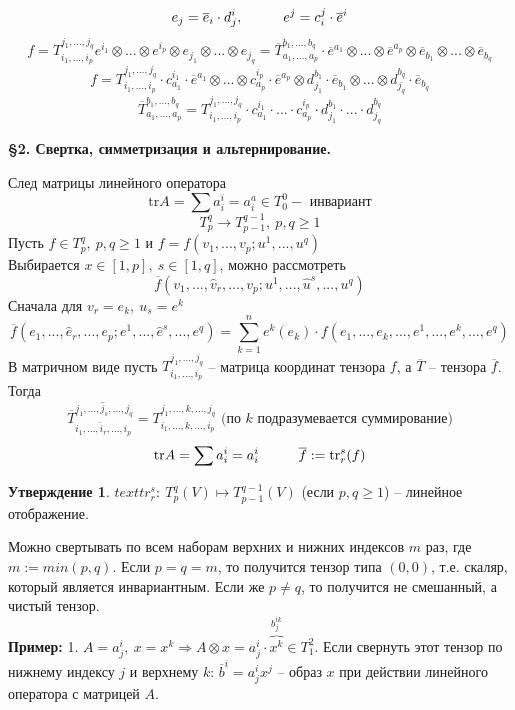 \documentclass[a4paper, 12pt]{article}
\newcommand\tab[1][.5cm]{\hspace*{#1}}
\theoremstyle{definition}
\newtheorem*{subtheorem}{Утверждение}
\begin{document}
    $$e_j = \overline{e}_i\cdot d_j^i,\tab[1cm] e^j = c_i^j\cdot \overline{e}^i$$ 
    $$f = T_{i_1,...,i_p}^{j_1,...,j_q}e^{i_1}\otimes ... \otimes e^{i_p} \otimes e_{j_1} \otimes ... \otimes e_{j_q} = \overline{T}_{a_1,...,a_p}^{b_1,...,b_q} \cdot\overline{e}^{a_1}\otimes ... \otimes \overline{e}^{a_p}\otimes \overline{e}_{b_1}\otimes ... \otimes \overline{e}_{b_q}$$
    $$f = T_{i_1,...,i_p}^{j_1,...,j_q}\cdot c_{a_1}^{i_1}\cdot \overline{e}^{a_1} \otimes ... \otimes c_{a_p}^{i_p}\cdot \overline{e}^{a_p} \otimes d_{j_1}^{b_1}\cdot \overline{e}_{b_1} \otimes ... \otimes d_{j_q}^{b_q}\cdot \overline{e}_{b_q}$$
    $$\boxed{\overline{T}_{a_1,...,a_p}^{b_1,...,b_q} = T_{i_1,...,i_p}^{j_1,...,j_q}\cdot c_{a_1}^{i_1}\cdot ... \cdot c_{a_p}^{i_p} \cdot d_{j_1}^{b_1}\cdot ... \cdot d_{j_q}^{b_q}}$$
    \begin{center}
        \begin{Large}
            \textbf{\S2. Свертка, симметризация и альтернирование.}
        \end{Large}
    \end{center}
    След матрицы линейного оператора 
    $$\text{tr}A = \sum a_i^i = a_i^a \in T_0^0 - \text{ инвариант}$$
    $$T_p^q \to T_{p-1}^{q-1},\ p,q \geq 1$$
    Пусть $f \in T_p^q,\ p,q \geq 1$ и $f = f(v_1,...,v_p;u^1,...,u^q)$\\
    Выбирается $x \in [1,p],\ s \in [1,q]$, можно рассмотреть $$\overline{f}(v_1,...,\widehat{v}_r,..., v_p;u^1,...,\widehat{u}^s,...,u^q)$$
    Сначала для $v_r = e_k,\ u_s = e^k$
    $$\overline{f}(e_1,...,\widehat{e}_r,..., e_p;e^1,...,\widehat{e}^s,...,e^q) = \sum\limits_{k=1}^{n} e^k(e_k)\cdot f(e_1,...,e_k,...,e^1,...,e^k,...,e^q)$$ 
    В матричном виде пусть $T_{i_1,...,i_p}^{j_1,...,j_q}$ -- матрица координат тензора $f$, а $\overline{T}$ -- тензора $\overline{f}$. Тогда 
    $$\overline{T}_{i_1,...,\widehat{i}_r,...,i_p}^{j_1,...,\widehat{j}_s,...,j_q} = T_{i_1,...,k,...,i_p}^{j_1,...,k,...,j_q} \text{ (по $k$ подразумевается суммирование)}$$  
    $$\text{tr}A = \sum a_i^i  = a_i^i\tab[1cm] \overline{f} := \text{tr}_r^s (f)$$

    \begin{subtheorem}
        $text{tr}_r^s:\ T_p^q(V) \longmapsto T_{p-1}^{q-1}(V)$ (если $p,q \geq 1$) -- линейное отображение.
    \end{subtheorem}
    Можно свертывать по всем наборам верхних и нижних индексов $m$ раз, где $m := min(p,q)$. Если $p=q=m$, то получится тензор типа $(0,0)$, т.е. скаляр, который является инвариантным. Если же $p \neq q$, то получится не смешанный, а чистый тензор.\\
    \textbf{Пример:} 1. $A = a_j^i,\ x = x^k \Longrightarrow A \otimes x = a_j^i\cdot \overbrace{x^k}^{b_j^{ik}} \in T_1^2$. Если свернуть этот тензор по нижнему индексу $j$ и верхнему $k$: $\overline{b}^i = a_j^ix^j$ -- образ $x$ при действии линейного оператора с матрицей $A$.  
\end{document}
